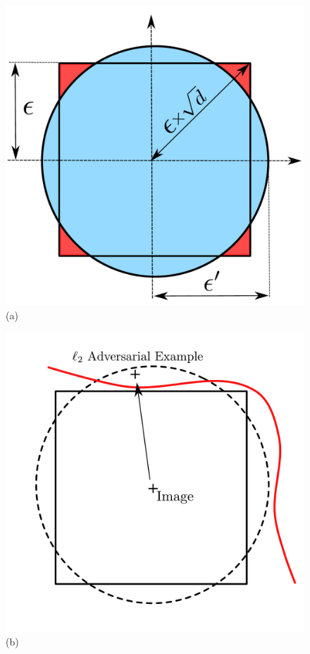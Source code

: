 \begin{figure}[ht]
  \centering
  \begin{minipage}{.32\linewidth}
    \centering
    \includegraphics[scale=0.15]{sections/appendix/ecml_rat/graphs/BallInclusionAdversarialtraining2.pdf}\\(a)
  \end{minipage}
  \begin{minipage}{.32\linewidth}
    \centering
    \includegraphics[scale=0.15]{sections/appendix/ecml_rat/graphs/BallAdversarialL2DecisionBoundary.pdf}\\(b)

\end{minipage}
\end{figure}
